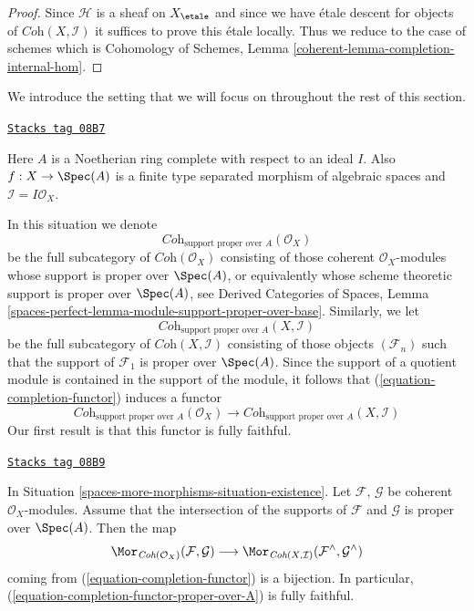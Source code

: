 \begin{proof}
Since $\mathcal{H}$ is a sheaf on $X_\etale$ and since
we have \'etale descent for objects of $\textit{Coh}(X, \mathcal{I})$
it suffices to prove this \'etale locally.
Thus we reduce to the case of schemes which is
Cohomology of Schemes, Lemma \ref{coherent-lemma-completion-internal-hom}.
\end{proof}

We introduce the setting that we will focus on throughout the
rest of this section.

\begin{definition}
\label{spaces-more-morphisms-situation-existence}
\href{https://stacks.math.columbia.edu/tag/08B7}{\texttt{Stacks tag 08B7}}

Here $A$ is a Noetherian ring complete with respect to an ideal $I$.
Also $f : X \to \Spec(A)$ is a finite type separated morphism of
algebraic spaces and $\mathcal{I} = I\mathcal{O}_X$.
\end{definition}

In this situation we denote
$$
\textit{Coh}_{\text{support proper over } A}(\mathcal{O}_X)
$$
be the full subcategory of $\textit{Coh}(\mathcal{O}_X)$
consisting of those coherent $\mathcal{O}_X$-modules whose
support is proper over $\Spec(A)$, or equivalently whose
scheme theoretic support is proper over $\Spec(A)$, see
Derived Categories of Spaces, Lemma
\ref{spaces-perfect-lemma-module-support-proper-over-base}.
Similarly, we let
$$
\textit{Coh}_{\text{support proper over } A}(X, \mathcal{I})
$$
be the full subcategory of $\textit{Coh}(X, \mathcal{I})$
consisting of those objects $(\mathcal{F}_n)$ such that
the support of $\mathcal{F}_1$ is proper over $\Spec(A)$.
Since the support of a quotient module is contained in the support
of the module, it follows that (\ref{equation-completion-functor})
induces a functor
\begin{equation}
\label{equation-completion-functor-proper-over-A}
\textit{Coh}_{\text{support proper over }A}(\mathcal{O}_X)
\longrightarrow
\textit{Coh}_{\text{support proper over }A}(X, \mathcal{I})
\end{equation}
Our first result is that this functor is fully faithful.

\begin{lemma}
\label{spaces-more-morphisms-lemma-fully-faithful}
\href{https://stacks.math.columbia.edu/tag/08B9}{\texttt{Stacks tag 08B9}}

In Situation \ref{spaces-more-morphisms-situation-existence}.
Let $\mathcal{F}$, $\mathcal{G}$ be coherent $\mathcal{O}_X$-modules.
Assume that the intersection of the supports of
$\mathcal{F}$ and $\mathcal{G}$ is proper over $\Spec(A)$. Then the map
$$
\Mor_{\textit{Coh}(\mathcal{O}_X)}(\mathcal{F}, \mathcal{G})
\longrightarrow
\Mor_{\textit{Coh}(X, \mathcal{I})}
(\mathcal{F}^\wedge, \mathcal{G}^\wedge)
$$
coming from (\ref{equation-completion-functor}) is a bijection.
In particular, (\ref{equation-completion-functor-proper-over-A})
is fully faithful.
\end{lemma}

